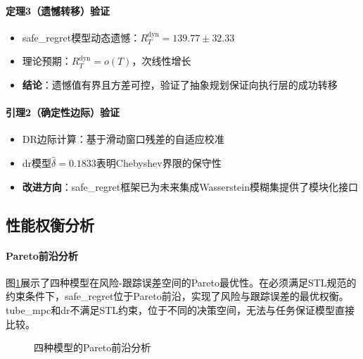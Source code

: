 \documentclass[12pt,a4paper]{ctexart}
\numberwithin{equation}{section}
\begin{document}
\paragraph*{定理3（遗憾转移）验证}
\begin{itemize}
    \item safe\_regret模型动态遗憾：$R_T^{\mathrm{dyn}} = 139.77 \pm 32.33$
    \item 理论预期：$R_T^{\mathrm{dyn}} = o(T)$，次线性增长
    \item \textbf{结论}：遗憾值有界且方差可控，验证了抽象规划保证向执行层的成功转移
\end{itemize}

\paragraph*{引理2（确定性边际）验证}
\begin{itemize}
    \item DR边际计算：基于滑动窗口残差的自适应校准
    \item dr模型$\widehat{\delta}=0.1833$表明Chebyshev界限的保守性
    \item \textbf{改进方向}：safe\_regret框架已为未来集成Wasserstein模糊集提供了模块化接口
\end{itemize}

\subsection{性能权衡分析}

\paragraph*{Pareto前沿分析}

图\ref{fig:pareto}展示了四种模型在风险-跟踪误差空间的Pareto最优性。在必须满足STL规范的约束条件下，safe\_regret位于Pareto前沿，实现了风险与跟踪误差的最优权衡。tube\_mpc和dr不满足STL约束，位于不同的决策空间，无法与任务保证模型直接比较。

\begin{figure}[htbp]
    \centering
    \caption{四种模型的Pareto前沿分析}
    \label{fig:pareto}
\end{figure}
\end{document}

